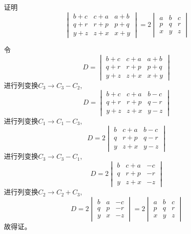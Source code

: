 \begin{questions}
    \question 证明
    \[
    \begin{vmatrix} 
    b+c & c+a & a+b \\ 
    q+r & r+p & p+q \\ 
    y+z & z+x & x+y 
    \end{vmatrix}
    = 2\begin{vmatrix} 
    a & b & c \\ 
    p & q & r \\ 
    x & y & z 
    \end{vmatrix}
    \]
    \begin{solution}
        令\[
        D=\begin{vmatrix} 
        b+c & c+a & a+b \\ 
        q+r & r+p & p+q \\ 
        y+z & z+x & x+y 
        \end{vmatrix}
        \]
        进行列变换$C_3\to C_3-C_2$,
        \[
        D = \begin{vmatrix} 
        b+c & c+a & b-c \\ 
        q+r & r+p & q-r \\ 
        y+z & z+x & y-z 
        \end{vmatrix}
        \]
        进行列变换$C_1\to C_1-C_3$,
        \[
        D = 2 \begin{vmatrix} 
        b & c+a & b-c \\ 
        q & r+p & q-r \\ 
        y & z+x & y-z 
        \end{vmatrix}
        \]
        进行列变换$C_3\to C_3-C_1$,
        \[
        D = 2 \begin{vmatrix} 
        b & c+a & -c \\ 
        q & r+p & -r \\ 
        y & z+x & -z 
        \end{vmatrix}
        \]
        进行列变换$C_2\to C_2+C_3$,
        \[
        D = 2 \begin{vmatrix} 
        b & a & -c \\ 
        q & p & -r \\ 
        y & x & -z 
        \end{vmatrix}
        =2 \begin{vmatrix} 
        a & b & c \\ 
        p & q & r \\ 
        x & y & z 
        \end{vmatrix}
        \]
        故得证。
    \end{solution}


\end{questions}
